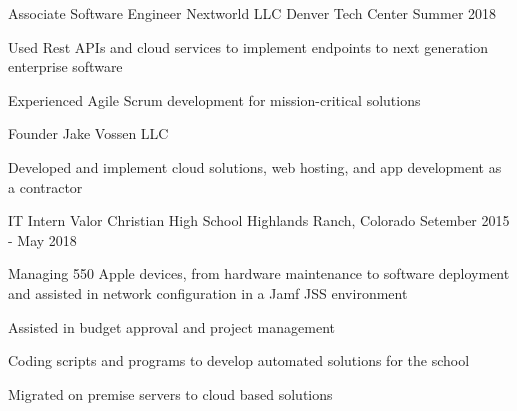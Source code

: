 

\begin{cventries}

  \cventry
    {Associate Software Engineer} %
    {Nextworld LLC} %
    {Denver Tech Center} %
    {Summer 2018} %
    {
      \begin{cvitems} %
        \item {Used Rest APIs and cloud services to implement
            endpoints to next generation enterprise software}
        \item {Experienced Agile Scrum development for mission-critical solutions}
      \end{cvitems}
    }

  \cventry
    {Founder}
    {Jake Vossen LLC} %
    {} %
    { }
    {
      \begin{cvitems} %
        \item {Developed and implement cloud solutions, web hosting,
            and app development as a contractor}
      \end{cvitems}
    }

  \cventry
    {IT Intern}
    {Valor Christian High School }
    {Highlands Ranch, Colorado} %
    {Setember 2015 - May 2018} %
    {
      \begin{cvitems} %
        \item {Managing 550 Apple devices, from hardware maintenance
            to software deployment and assisted in network
            configuration in a Jamf JSS environment}
        \item {Assisted in budget approval and project management}
        \item {Coding scripts and programs to develop automated
            solutions for the school}
        \item {Migrated on premise servers to cloud based solutions}
      \end{cvitems}
    }
\end{cventries}
